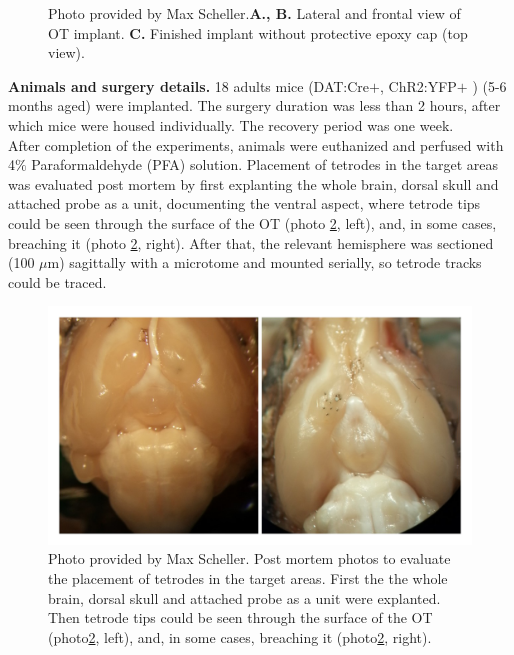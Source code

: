 \begin{framed}
\begin{figure}[H]
    \caption{Photo provided by Max Scheller.\textbf{A., B.} Lateral and frontal view of OT implant. \textbf{C.} Finished implant without protective epoxy cap (top view).}
    \label{fig:implant}
\end{figure}
\textbf{Animals and surgery details.}
18 adults mice (DAT:Cre$+$, ChR2:YFP$+$ ) (5-6 months aged) were implanted. The surgery duration was less than 2 hours, after which mice were housed individually. The recovery period was one week.\\ After completion of the experiments, animals were euthanized and perfused with 4$\%$ Paraformaldehyde (PFA) solution. Placement of tetrodes in the target areas was evaluated post mortem by first explanting the whole brain, dorsal skull and attached probe as a unit, documenting the ventral aspect, where tetrode tips could be seen through the surface of the OT (photo \ref{fig:surgery}, left), and, in some cases, breaching it (photo \ref{fig:surgery}, right). After that, the relevant hemisphere was sectioned (100 $\mu$m) sagittally with a microtome and mounted serially, so tetrode tracks could be traced.\\
\begin{figure}[H]
    \centering
    \includegraphics[scale=0.2]{figures/surgery_3.jpg}
    \caption{Photo provided by Max Scheller. Post mortem photos to evaluate the placement of tetrodes in the target areas. First the the whole brain, dorsal skull and attached probe as a unit were explanted. Then tetrode tips could be seen through the surface of the OT (photo\ref{fig:surgery}, left), and, in some cases, breaching it (photo\ref{fig:surgery}, right).}
    \label{fig:surgery}
\end{figure}

\end{framed}
